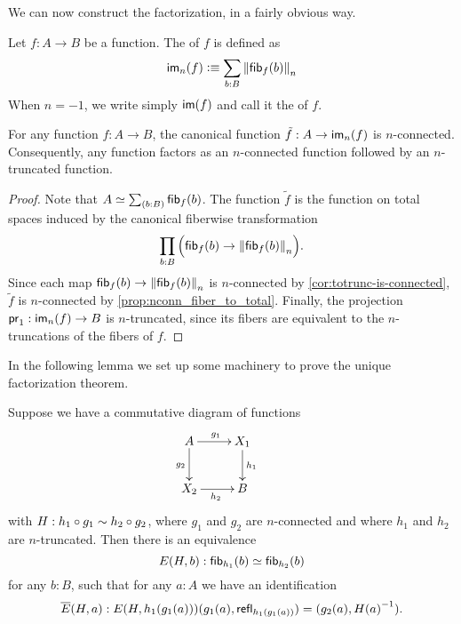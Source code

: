 We can now construct the factorization, in a fairly obvious way.

\begin{defn}\label{defn:modal-image}
Let $f:A\to B$ be a function. The 
%
%
%
%
of $f$ is defined as
\begin{equation*}
\im_n(f)\defeq \sm{b:B} \trunc n{\hfib{f}b}
\end{equation*}
When $n=-1$, we write simply $\im(f)$ and call it the  of $f$.
\end{defn}

\begin{lem}\label{prop:to_image_is_connected}
For any function $f:A\to B$, the canonical function $\tilde{f}:A\to\im_n(f)$ is $n$-connected. 
Consequently, any function factors as an $n$-connected function followed by an $n$-truncated function.
\end{lem}

\begin{proof}
Note that $A\eqvsym\sm{b:B}\hfib{f}b$. The function $\tilde{f}$ is the function on total spaces induced by the canonical fiberwise transformation
\begin{equation*}
\prd{b:B} \Parens{\hfib{f}b\to\trunc n{\hfib{f}b}}.
\end{equation*}
Since each map $\hfib{f}b\to\trunc n{\hfib{f}b}$ is $n$-connected by \autoref{cor:totrunc-is-connected}, $\tilde{f}$ is $n$-connected by \autoref{prop:nconn_fiber_to_total}.
Finally, the projection $\proj1:\im_n(f) \to B$ is $n$-truncated, since its fibers are equivalent to the $n$-truncations of the fibers of $f$.
\end{proof}

In the following lemma we set up some machinery to prove the unique factorization theorem.

\begin{lem}\label{prop:factor_equiv_fiber}
Suppose we have a commutative diagram of functions
\begin{equation*}
  \xymatrix{
    {A} \ar[r]^{g_1} \ar[d]_{g_2} &
    {X_1} \ar[d]^{h_1} &
    \\
    {X_2} \ar[r]_{h_2}
    &
    {B}
  }
\end{equation*}
with $H:h_1\circ g_1\htpy h_2\circ g_2$, where $g_1$ and $g_2$ are $n$-connected and where $h_1$ and $h_2$ are $n$-truncated.
Then there is an equivalence
\begin{equation*}
E(H,b):\hfib{h_1}b\eqvsym\hfib{h_2}b
\end{equation*}
for any $b:B$, such that for any $a:A$ we have an identification
\[\overline{E}(H,a) :  E(H,h_1(g_1(a)))({g_1(a),\refl{h_1(g_1(a))}}) = \pairr{g_2(a),\opp{H(a)}}.\]
\end{lem}

